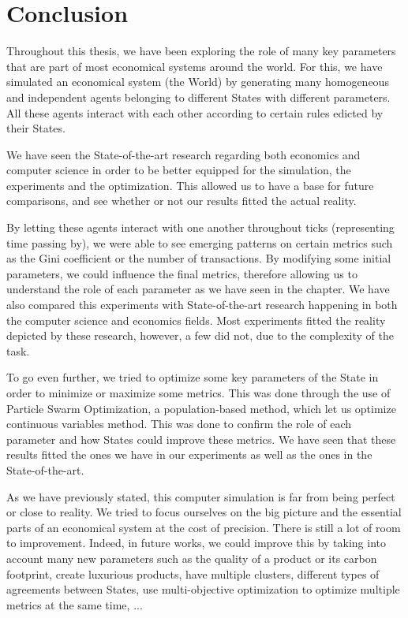 \chapter{Conclusion}

Throughout this thesis, we have been exploring the role of many key parameters that are part of most economical systems around the world. For this, we have simulated an economical system (the World) by generating many homogeneous and independent agents belonging to different States with different parameters. All these agents interact with each other according to certain rules edicted by their States. 

We have seen the State-of-the-art research regarding both economics and computer science in order to be better equipped for the simulation, the experiments and the optimization. This allowed us to have a base for future comparisons, and see whether or not our results fitted the actual reality.

By letting these agents interact with one another throughout ticks (representing time passing by), we were able to see emerging patterns on certain metrics such as the Gini coefficient or the number of transactions. By modifying some initial parameters, we could influence the final metrics, therefore allowing us to understand the role of each parameter as we have seen in the  chapter. We have also compared this experiments with State-of-the-art research happening in both the computer science and economics fields. Most experiments fitted the reality depicted by these research, however, a few did not, due to the complexity of the task.

To go even further, we tried to optimize some key parameters of the State in order to minimize or maximize some metrics. This was done through the use of Particle Swarm Optimization, a population-based method, which let us optimize continuous variables method. This was done to confirm the role of each parameter and how States could improve these metrics. We have seen that these results fitted the ones we have in our experiments as well as the ones in the State-of-the-art.

As we have previously stated, this computer simulation is far from being perfect or close to reality. We tried to focus ourselves on the big picture and the essential parts of an economical system at the cost of precision. There is still a lot of room to improvement. Indeed, in future works, we could improve this by taking into account many new parameters such as the quality of a product or its carbon footprint,  create luxurious products, have multiple clusters, different types of agreements between States, use multi-objective optimization to optimize multiple metrics at the same time, ...